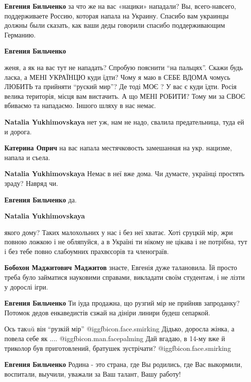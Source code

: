 \begin{itemize}
\begin{itemize}
\textbf{Евгения Бильченко} за что же на вас «нацики» нападали? Вы, всего-навсего, поддерживаете Россию, которая напала на Украину. Спасибо вам украинцы должны были сказать, как ваши деды говорили спасибо поддерживающим Германию.

\textbf{Евгения Бильченко} 

женя, а як на вас тут не нападать? Спробую пояснити \enquote{на пальцях}. Скажи будь
ласка, а МЕНІ УКРАЇНЦЮ куди їдти? Чому я маю в СЕБЕ ВДОМА чомусь ЛЮБИТЬ та
прийняти \enquote{руский мир}? Де тоді МОЄ ? У вас є куди їдти. Росія велика територія,
місця вам вистачить. А що МЕНІ РОБИТИ? Тому ми за СВОЄ вбиваємо та нападаємо.
Іншого шляху в нас немає.


\textbf{Natalia Yukhimovskaya} нет уж, нам не надо, свалила предательница, туда ей и дорога.

\textbf{Катерина Оприч} на вас напала местячковость замешанная на укр. нацизме, напала и съела.

\textbf{Natalia Yukhimovskaya} Немає в неї вже дома. Чи думаєте, українці простять зраду? Навряд чи.

\textbf{Евгения Бильченко} да.

\textbf{Natalia Yukhimovskaya} 

якого дому? Таких малохольних у нас і без неї хватає. Хоті сруцкій мір, жри
повною ложкою і не обляпуйся, а в Україні ти нікому не цікава і не потрібна, тут
і без тебе повно слабоумних прахвєсорів та членограїв.


\textbf{Бобохон Маджитович Маджитов} знаєте, Евгенія дуже талановила. Їй просто треба було займатися науковими справами, викладати своїм студентам, і не лізти у дорослі ігри.

\textbf{Евгения Бильченко} Ти іуда продажна, що рузгий мір не прийняв запроданку? Потомок дедов енкаведистів єзжай на дініри линири будеш сепаркой.

Ось такuŭ він \enquote{рузкій мір} @igg{fbicon.face.smirking} 
Дідько, доросла жінка, а повела себе як .... @igg{fbicon.man.facepalming} 
Дай вгадаю, в 14-му вже й триколор був приготовлений, братушек зустрічати? @igg{fbicon.face.smirking} 

\textbf{Евгения Бильченко} Родина - это страна, где Вы родились, где Вас выкормили, воспитали, выучили, уважали за Ваш талант, Вашу работу!


\end{itemize}
\end{itemize}
